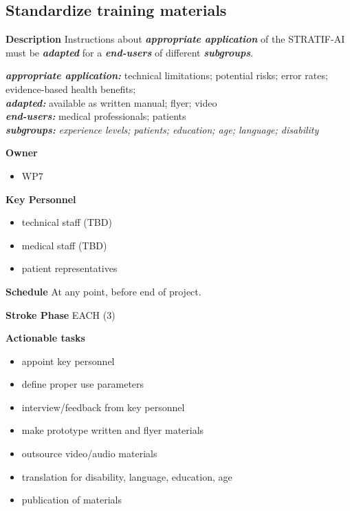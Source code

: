 \documentclass[
  letterpaper,
  DIV=11,
  numbers=noendperiod]{scrreport}
\providecommand{\tightlist}{%
  \setlength{\itemsep}{0pt}\setlength{\parskip}{0pt}}\usepackage{longtable,booktabs,array}
\begin{document}
\hypertarget{standardize-training-materials}{%
\subsection{Standardize training
materials}\label{standardize-training-materials}}

\textbf{Description} Instructions about \textbf{\emph{appropriate
application}} of the STRATIF-AI must be \textbf{\emph{adapted}} for a
\textbf{\emph{end-users}} of different \textbf{\emph{subgroups}}.

\textbf{\emph{appropriate application:}} technical limitations;
potential risks; error rates; evidence-based health benefits;\\
\textbf{\emph{adapted:}} available as written manual; flyer; video\\
\textbf{\emph{end-users:}} medical professionals; patients\\
\textbf{\emph{subgroups:}} \emph{experience levels; patients; education;
age; language; disability}

\textbf{Owner}

\begin{itemize}
\tightlist
\item
  WP7
\end{itemize}

\textbf{Key Personnel}

\begin{itemize}
\tightlist
\item
  technical staff (TBD)
\item
  medical staff (TBD)
\item
  patient representatives
\end{itemize}

\textbf{Schedule} At any point, before end of project.

\textbf{Stroke Phase} EACH (3)

\textbf{Actionable tasks}

\begin{itemize}
\tightlist
\item
  appoint key personnel
\item
  define proper use parameters
\item
  interview/feedback from key personnel
\item
  make prototype written and flyer materials
\item
  outsource video/audio materials
\item
  translation for disability, language, education, age
\item
  publication of materials
\end{itemize}
\end{document}

